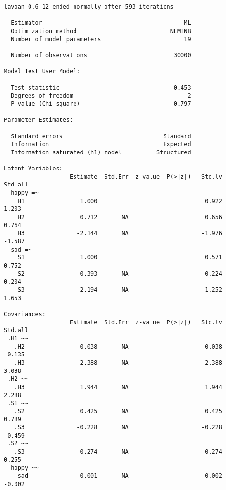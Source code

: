 \documentclass[
  letterpaper,
  DIV=11,
  numbers=noendperiod]{scrreprt}
\begin{document}
\begin{verbatim}
lavaan 0.6-12 ended normally after 593 iterations

  Estimator                                         ML
  Optimization method                           NLMINB
  Number of model parameters                        19

  Number of observations                         30000

Model Test User Model:
                                                      
  Test statistic                                 0.453
  Degrees of freedom                                 2
  P-value (Chi-square)                           0.797

Parameter Estimates:

  Standard errors                             Standard
  Information                                 Expected
  Information saturated (h1) model          Structured

Latent Variables:
                   Estimate  Std.Err  z-value  P(>|z|)   Std.lv  Std.all
  happy =~                                                              
    H1                1.000                               0.922    1.203
    H2                0.712       NA                      0.656    0.764
    H3               -2.144       NA                     -1.976   -1.587
  sad =~                                                                
    S1                1.000                               0.571    0.752
    S2                0.393       NA                      0.224    0.204
    S3                2.194       NA                      1.252    1.653

Covariances:
                   Estimate  Std.Err  z-value  P(>|z|)   Std.lv  Std.all
 .H1 ~~                                                                 
   .H2               -0.038       NA                     -0.038   -0.135
   .H3                2.388       NA                      2.388    3.038
 .H2 ~~                                                                 
   .H3                1.944       NA                      1.944    2.288
 .S1 ~~                                                                 
   .S2                0.425       NA                      0.425    0.789
   .S3               -0.228       NA                     -0.228   -0.459
 .S2 ~~                                                                 
   .S3                0.274       NA                      0.274    0.255
  happy ~~                                                              
    sad              -0.001       NA                     -0.002   -0.002


\end{verbatim}
\end{document}
